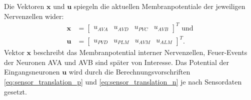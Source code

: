 	Die Vektoren $\boldsymbol{x}$ und $\boldsymbol{u}$ spiegeln die aktuellen Membranpotentiale der jeweiligen Nervenzellen wider:
	\begin{align}
		\boldsymbol{x} &= \begin{bmatrix}u_{AVA} & u_{AVD} & u_{PVC} & u_{AVB}\end{bmatrix}^T\text{ und}\\
		\boldsymbol{u} &= \begin{bmatrix}u_{PVD} & u_{PLM} & u_{AVM} & u_{ALM}\end{bmatrix}^T\text{.}
		\label{eq:xu}
	\end{align}
	Vektor $\boldsymbol{x}$ beschreibt das Membranpotential interner Nervenzellen, Feuer-Events der Neuronen AVA und AVB sind später von Interesse. Das Potential der Eingangsneuronen $\boldsymbol{u}$ wird durch die Berechnungsvorschriften \eqref{eq:sensor_translation_p} und \eqref{eq:sensor_translation_n} je nach Sensordaten gesetzt.
	
